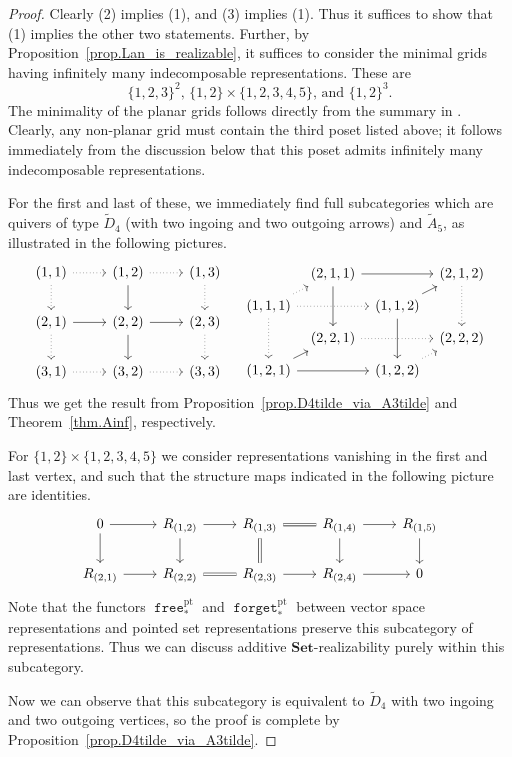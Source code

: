 \documentclass[a4paper]{amsart}
\theoremstyle{plain}
\theoremstyle{definition}
\theoremstyle{remark}
\newcommand{\funct}[1]{\operatorname{\mathtt{#1}}}
\newcommand{\Set}{\mathbf{Set}}
\begin{document}
\begin{proof}
Clearly (2) implies (1), and (3) implies (1). Thus it suffices to show that (1) implies the other two statements. Further, by Proposition~\ref{prop.Lan_is_realizable}, it suffices to consider the minimal grids having infinitely many indecomposable representations. These are
\[ \{ 1,2,3\}^2 \text{, } \{1,2\} \times \{1,2,3,4,5\} \text{, and } \{1,2\}^3. \]
The minimality of the planar grids follows directly from the summary in \cite[Theorem 1.3]{bauer2020cotorsion}. Clearly, any non-planar grid must contain the third poset listed above; it follows immediately from the discussion below that this poset admits infinitely many indecomposable representations.

For the first and last of these, we immediately find full subcategories which are quivers of type \( \tilde{D}_4 \) (with two ingoing and two outgoing arrows) and \( \tilde{A}_5 \), as illustrated in the following pictures.
\[ \begin{tikzcd}
(1,1) \ar[r, dotted] \ar[d, dotted] & (1,2) \ar[r,dotted] \ar[d] & (1,3) \ar[d,dotted] \\
(2,1) \ar[r] \ar[d, dotted] & (2,2) \ar[r] \ar[d] & (2,3) \ar[d,dotted] \\
(3,1) \ar[r, dotted] & (3,2) \ar[r,dotted] & (3,3) 
\end{tikzcd}
\quad
\begin{tikzcd}[sep=2mm]
& (2,1,1) \ar[rr] \ar[dd] && (2,1,2) \ar[dd,dotted]  \\
(1,1,1) \ar[rr,dotted] \ar[dd,dotted] \ar[ru,dotted] && (1,1,2) \ar[dd] \ar[ru] \\
& (2,2,1) \ar[rr,dotted] && (2,2,2) \\
(1,2,1) \ar[rr] \ar[ru] && (1,2,2) \ar[ru,dotted] 
\end{tikzcd}
\]
Thus we get the result from Proposition~\ref{prop.D4tilde_via_A3tilde} and Theorem~\ref{thm.Ainf}, respectively.

For \( \{ 1,2 \} \times \{1,2,3,4,5 \} \) we consider representations vanishing in the first and last vertex, and such that the structure maps indicated in the following picture are identities.
\[ \begin{tikzcd}
0 \ar[r] \ar[d] & R_{(1,2)} \ar[r] \ar[d] & R_{(1,3)} \ar[r,equal] \ar[d,equal] & R_{(1,4)} \ar[r] \ar[d] & R_{(1,5)} \ar[d] \\
R_{(2,1)} \ar[r] & R_{(2,2)} \ar[r,equal] & R_{(2,3)} \ar[r] & R_{(2,4)} \ar[r] & 0
\end{tikzcd} \]
Note that the functors \( \funct{free}^\mathrm{pt}_* \) and \( \funct{forget}^\mathrm{pt}_* \) between vector space representations and pointed set representations preserve this subcategory of representations. Thus we can discuss additive \( \Set \)-realizability purely within this subcategory.

Now we can observe that this subcategory is equivalent to \( \tilde{D}_4 \) with two ingoing and two outgoing vertices, so the proof is complete by Proposition~\ref{prop.D4tilde_via_A3tilde}.
\end{proof}
\end{document}
